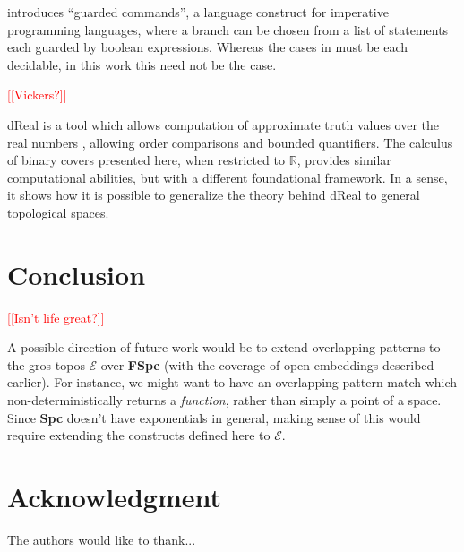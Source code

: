 \documentclass[conference]{IEEEtran}
\newcommand{\R}{\mathbb{R}}
\newcommand{\note}[1]{\textcolor{red}{[[{#1}]]}}
\begin{document}
\cite{dijkstra} introduces ``guarded commands'', a language construct for imperative programming languages, where a branch can be chosen from a list of statements each guarded by boolean expressions. Whereas the cases in \cite{dijkstra} must be each decidable, in this work this need not be the case.

\note{Vickers?}

dReal is a tool which allows computation of approximate truth values over the real numbers \cite{dReal}, allowing order comparisons and bounded quantifiers. The calculus of binary covers presented here, when restricted to $\R$, provides similar computational abilities, but with a different foundational framework. In a sense, it shows how it is possible to generalize the theory behind dReal to general topological spaces.

\section{Conclusion}
\note{Isn't life great?}

A possible direction of future work would be to extend overlapping patterns to the gros topos $\mathcal{E}$ over \textbf{FSpc} (with the coverage of open embeddings described earlier). For instance, we might want to have an overlapping pattern match which non-deterministically returns a \emph{function}, rather than simply a point of a space. Since \textbf{Spc} doesn't have exponentials in general, making sense of this would require extending the constructs defined here to $\mathcal{E}$.




\section*{Acknowledgment}


The authors would like to thank...







%
%
%






\end{document}
